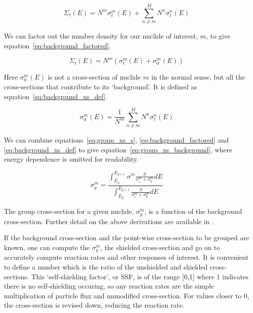 \begin{equation}
  \label{eq:background_xs}
  \Sigma_{t}(E) = N^{m} \sigma_{t}^{m}(E) + \sum_{n \neq m}^{M} N^{n} \sigma_{t}^{n}(E)
\end{equation}

We can factor out the number density for our nuclide of interest, $m$, to give equation~\ref{eq:background_factored}. 

\begin{equation}
  \label{eq:background_factored}
  \Sigma_{t}(E) = N^{m} (\sigma_{t}^{m}(E) + \sigma_{0}^{m}(E))
\end{equation}

Here $\sigma_{0}^{m}(E)$ is not a cross-section of nuclide $m$ in the normal sense, but all the cross-sections that contribute to its `background'. It is defined as equation~\ref{eq:background_xs_def}.

\begin{equation}
  \label{eq:background_xs_def}
  \sigma_{0}^{m}(E) = \frac{1}{N^{m}} \sum_{n \neq m}^{M} N^{n} \sigma_{t}^{n}(E)
\end{equation}

We can combine equations~\ref{eq:group_xs_s}, \ref{eq:background_factored} and \ref{eq:background_xs_def} to give equation~\ref{eq:group_xs_background}, where energy dependence is omitted for readability.

\begin{equation}
  \label{eq:group_xs_background}
  \sigma_{g}^{m} = \frac{\int_{E_{g}}^{E_{g+1}} \sigma^{m} \frac{S}{\sigma_{t}^{m} + \sigma_{0}^{m}} dE}{\int_{E_{g}}^{E_{g+1}} \frac{S}{\sigma_{t}^{m} + \sigma_{0}^{m}} dE}
\end{equation}

The group cross-section for a given nuclide, $\sigma_{g}^{m}$, is a function of the background cross-section. Further detail on the above derivations are available in \cite{Dembia2013} \cite{Bell1970}. 

If the background cross-section and the point-wise cross-section to be grouped are known, one can compute the $\sigma_{g}^{m}$, the shielded cross-section and go on to accurately compute reaction rates and other responses of interest. It is convenient to define a number which is the ratio of the unshielded and shielded cross-sections. This `self-shielding factor', or SSF, is of the range [0,1] where 1 indicates there is no self-shielding occuring, so any reaction rates are the simple multiplication of particle flux and unmodified cross-section. For values closer to 0, the cross-section is revised down, reducing the reaction rate. 

